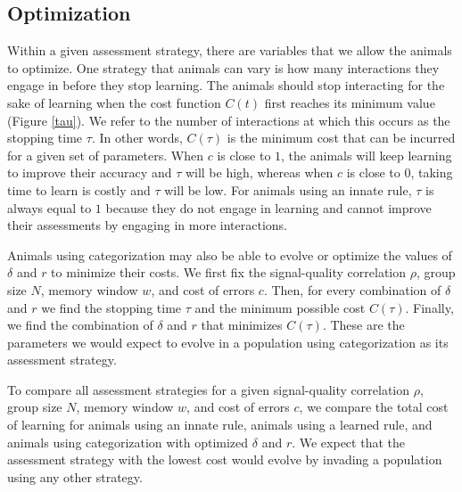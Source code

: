 \subsection{Optimization }
Within a given assessment strategy, there are variables that we allow the animals to optimize. One strategy that animals can vary is how many interactions they engage in before they stop learning. The animals should stop interacting for the sake of learning when the cost function $C(t)$ first reaches its minimum value (Figure \ref{tau}). We refer to the number of interactions at which this occurs as the stopping time $\tau$. In other words, $C(\tau)$ is the minimum cost that can be incurred for a given set of parameters. When $c$ is close to $1$, the animals will keep learning to improve their accuracy and $\tau$ will be high, whereas when $c$ is close to $0$, taking time to learn is costly and $\tau$ will be low. For animals using an innate rule, $\tau$ is always equal to $1$ because they do not engage in learning and cannot improve their assessments by engaging in more interactions. 

Animals using categorization may also be able to evolve or optimize the values of $\delta$ and $r$ to minimize their costs. We first fix the signal-quality correlation $\rho$,  group size $N$, memory window $w$, and cost of errors $c$. Then, for every combination of $\delta$ and $r$ we find the stopping time $\tau$ and the minimum possible cost $C(\tau)$. Finally, we find the combination of $\delta$ and $r$ that minimizes $C(\tau)$. These are the parameters we would expect to evolve in a population using categorization as its assessment strategy. 

To compare all assessment strategies for a given signal-quality correlation $\rho$, group size $N$, memory window $w$, and cost of errors $c$, we compare the total cost of learning for animals using an innate rule, animals using a learned rule, and animals using categorization with optimized $\delta$ and $r$. We expect that the assessment strategy with the lowest cost would evolve by invading a population using any other strategy.


